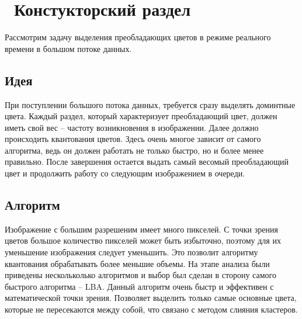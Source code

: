 \chapter{ Констукторский раздел}
\label{cha:design}

Рассмотрим задачу выделения преобладающих цветов в режиме реального времени в большом потоке данных. 

\section{ Идея}
При поступлении большого потока данных, требуется сразу выделять доминтные цвета. Каждый раздел, который характеризует преобладающий цвет, должен иметь свой вес -- частоту возникновения в изображении. Далее должно происходить квантования цветов. Здесь очень многое зависит от самого алгоритма, ведь он должен работать не только быстро, но и более менее правильно. После завершения остается выдать самый весомый преобладающий цвет и продолжить работу со следующим изображением в очереди.

\section{ Алгоритм}
Изображение с большим разрешеним имеет много пикселей. С точки зрения цветов большое количество пикселей может быть избыточно, поэтому для их уменьшение изображения следует уменьшить. Это позволит алгоритму квантования обрабатывать более меньшие объемы. На этапе анализа были приведены нескольколько алгоритмов и выбор был сделан в сторону самого быстрого алгоритма -- LBA. Данный алгоритм очень быстр и эффективен с математической точки зрения. Позволяет выделить только самые основные цвета, которые не пересекаются между собой, что связано с методом слияния кластеров. 
